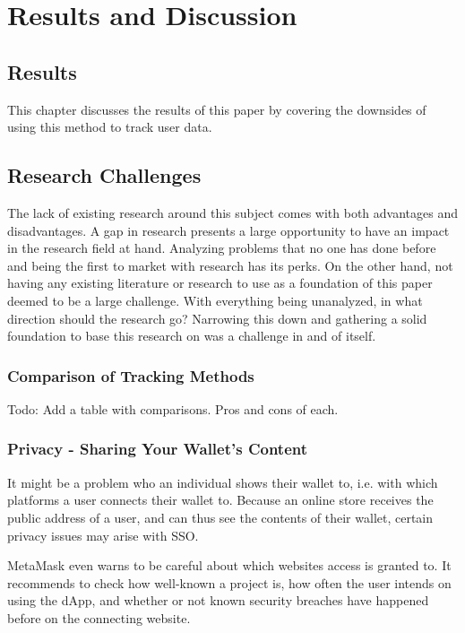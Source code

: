 \chapter{Results and Discussion}
\label{ch:results}


%
%
\section{Results}
\label{sec:results:results}
This chapter discusses the results of this paper by covering the downsides of using this method to track user data.


%
%
\section{Research Challenges}
\label{sec:results:researchChallenges}
The lack of existing research around this subject comes with both advantages and disadvantages. A gap in research presents a large opportunity to have an impact in the research field at hand. Analyzing problems that no one has done before and being the first to market with research has its perks. On the other hand, not having any existing literature or research to use as a foundation of this paper deemed to be a large challenge. With everything being unanalyzed, in what direction should the research go? Narrowing this down and gathering a solid foundation to base this research on was a challenge in and of itself.


\subsection{Comparison of Tracking Methods}
\label{sub:results:data}
Todo: Add a table with comparisons. Pros and cons of each.



\subsection{Privacy - Sharing Your Wallet's Content}
\label{sec:results:walletContent}
It might be a problem who an individual shows their wallet to, i.e. with which platforms a user connects their wallet to. Because an online store receives the public address of a user, and can thus see the contents of their wallet, certain privacy issues may arise with SSO.

MetaMask even warns to be careful about which websites access is granted to. It recommends to check how well-known a project is, how often the user intends on using the dApp, and whether or not known security breaches have happened before on the connecting website. \cite{metaMask}

